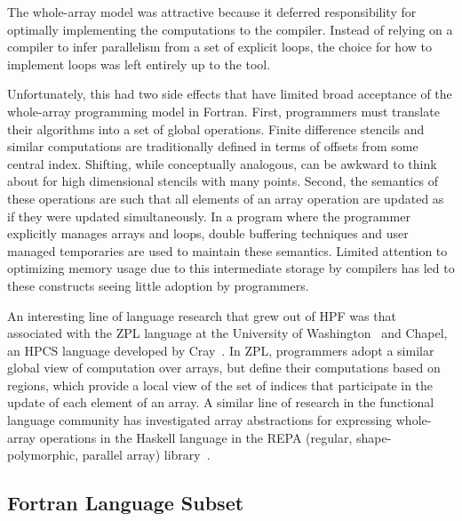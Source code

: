 The whole-array model was attractive because it deferred
responsibility for optimally implementing the computations to the
compiler.  Instead of relying on a compiler to infer parallelism from
a set of explicit loops, the choice for how to implement loops was
left entirely up to the tool.

Unfortunately, this had two side effects that have limited broad
acceptance of the whole-array programming model in Fortran.  First,
programmers must translate their algorithms into a set of global
operations.  Finite difference stencils and similar computations are
traditionally defined in terms of offsets from some central index.
Shifting, while conceptually analogous, can be awkward to think about
for high dimensional stencils with many points.  Second, the semantics
of these operations are such that all elements of an array operation
are updated as if they were updated simultaneously.  In a program
where the programmer explicitly manages arrays and loops, double
buffering techniques and user managed temporaries are used to maintain
these semantics.  Limited attention to optimizing memory usage due to
this intermediate storage by compilers has led to these constructs
seeing little adoption by programmers.


An interesting line of language research that grew out of HPF was that
associated with the ZPL language at the University of
Washington~\citep{chamberlain04zpl} and Chapel, an HPCS language developed by
Cray~\citep{chamberlainchapel}.  In ZPL, programmers adopt a similar global view
of computation over arrays, but define their computations based on regions,
which provide a local view of the set of indices that participate in the update
of each element of an array.  A similar line of research in the functional
language community has investigated array abstractions for expressing
whole-array operations in the Haskell language in the REPA (regular, shape-polymorphic,
parallel array) library~\citep{keller10repa}.

\subsection{Fortran Language Subset}

